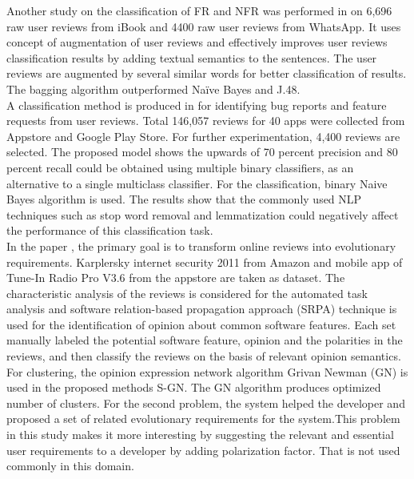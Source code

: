 	Another study on the classification of FR
and NFR was performed in \cite{lu2017automatic} on 6,696 raw user reviews from
iBook and 4400 raw user reviews from WhatsApp. It uses concept of
augmentation of user reviews and effectively improves user reviews classification results by
adding textual semantics to the sentences. The user reviews are augmented by several similar
words for better classification of results. The bagging algorithm outperformed Naïve Bayes and J.48.\\

	A classification method is produced in \cite{maalej2015bug} for identifying
bug reports and feature requests from user reviews. Total 146,057 reviews for 40 apps were
collected from Appstore and Google Play Store. For further experimentation, 4,400 reviews
are selected. The proposed model shows the upwards of 70 percent precision and 80 percent
recall could be obtained using multiple binary classifiers, as an alternative to a single multiclass
classifier. For the classification, binary Naive Bayes algorithm is used. The results show that
the commonly used NLP techniques such as stop word removal and lemmatization could
negatively affect the performance of this classification task.\\

	In the paper \cite{jiang2014}, the primary goal is to transform online reviews into evolutionary requirements.
Karplersky internet security 2011 from Amazon and mobile app of Tune-In Radio Pro V3.6
from the appstore are taken as dataset. The characteristic analysis of the reviews is
considered for the automated task analysis and software relation-based propagation approach
(SRPA) technique is used for the identification of opinion about common software features. Each set
manually labeled the potential software feature, opinion and the polarities in the reviews, and
then classify the reviews on the basis of relevant opinion semantics. For clustering, the opinion
expression network algorithm Grivan Newman (GN) is used in the proposed methods S-GN. The GN algorithm produces optimized number of clusters. For the second problem, the system helped the developer and proposed a set of related evolutionary requirements for the system.This problem in this study makes it more interesting by suggesting the relevant and essential
user requirements to a developer by adding polarization factor. That is not used
commonly in this domain.\\

